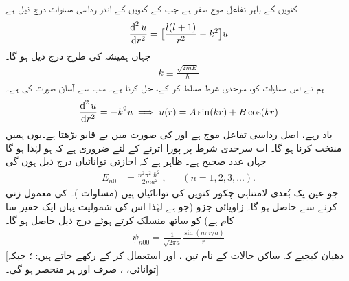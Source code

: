 \quad
کنویں  کے باہر تفاعل موج صفر ہے جب کے کنویں  کے اندر رداسی مساوات درج ذیل ہے
\begin{align}\label{مساوات_ابعادی_مربعی_کنواں_الف}
\frac{\dif^{\,2}u}{\dif r^{2}}=\big[\frac{l(l+1)}{r^{2}}-k^{2}\big]u 
\end{align}
جہاں ہمیشہ کی طرح درج ذیل ہو گا۔
\begin{align}
k\equiv\frac{\sqrt{2mE}}{\hslash} 
\end{align}
ہم نے اس مساوات کو، سرحدی شرط  مسلط کر کے، حل کرنا ہے۔ سب سے آسان صورت  کی ہے۔
\begin{align*}
\frac{\dif^{\,2}u}{\dif r^{2}}=-k^{2}u\implies {u(r)=A\sin(kr)+B\cos(kr)} 
\end{align*}
یاد رہے،  اصل رداسی تفاعل موج  ہے اور   کی صورت میں   بے قابو بڑھتا ہے۔یوں ہمیں  منتخب کرنا ہو گا۔ اب سرحدی شرط پر پورا اترنے کے لئے ضروری ہے  کہ  ہو لہٰذا    ہو گا جہاں   عدد صحیح ہے۔ ظاہر ہے کہ اجازتی توانائیاں درج ذیل ہوں گی
\begin{align}
E_{n0}&=\frac{n^{2}\pi^{2}\hslash^{2}}{2ma^{2}},&&(n=1,2,3,...). 
\end{align}
جو عین یک بُعدی لامتناہی چکور کنویں  کی توانائیاں ہیں (مساوات )۔   کی معمول زنی کرنے   سے  حاصل ہو گا۔ زاویائی جزو (جو   ہے لہٰذا اس کی شمولیت یہاں ایک حقیر سا کام ہے) کو ساتھ منسلک کرتے ہوئے درج ذیل حاصل ہو گا۔ 
\begin{align}
\psi_{n00}=\frac{1}{\sqrt{2\pi a}}\frac{\sin(n\pi r/a)}{r} 
\end{align}
[دھیان کیجیے کہ ساکن حالات کے نام تین  ،  اور  استعمال کر کے رکھے جاتے ہیں: ؛ جبکہ توانائی، ،   صرف  اور  پر منحصر ہو گی۔] 

